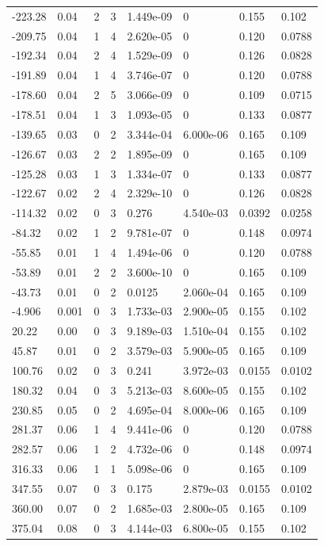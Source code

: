\documentclass[preview]{standalone}
\begin{document}
{{\begin{tabular}{L{1.2cm}C{1.2cm} C{0.3cm}C{0.5cm} C{1.4cm}C{1.4cm} C{1.4cm}C{1.4cm}}
  -223.28  &  0.04  & 2     &  3 &  1.449e-09  & 0  & 0.155 &  0.102   \\ 
  -209.75  &  0.04  & 1     &  4 &  2.620e-05  & 0  & 0.120 &  0.0788   \\ 
  -192.34  &  0.04  & 2     &  4 &  1.529e-09  & 0  & 0.126 &  0.0828   \\ 
  -191.89  &  0.04  & 1     &  4 &  3.746e-07  & 0  & 0.120 &  0.0788   \\ 
  -178.60  &  0.04  & 2     &  5 &  3.066e-09  & 0  & 0.109 &  0.0715   \\ 
  -178.51  &  0.04  & 1     &  3 &  1.093e-05  & 0  & 0.133 &  0.0877   \\ 
  -139.65  &  0.03  & 0     &  2 &  3.344e-04  & 6.000e-06  & 0.165 &  0.109   \\ 
  -126.67  &  0.03  & 2     &  2 &  1.895e-09  & 0  & 0.165 &  0.109   \\ 
  -125.28  &  0.03  & 1     &  3 &  1.334e-07  & 0  & 0.133 &  0.0877   \\ 
  -122.67  &  0.02  & 2     &  4 &  2.329e-10  & 0  & 0.126 &  0.0828   \\ 
  -114.32  &  0.02  & 0     &  3 &  0.276  & 4.540e-03  & 0.0392 &  0.0258   \\ 
  -84.32  &  0.02  & 1     &  2 &  9.781e-07  & 0  & 0.148 &  0.0974   \\ 
  -55.85  &  0.01  & 1     &  4 &  1.494e-06  & 0  & 0.120 &  0.0788   \\ 
  -53.89  &  0.01  & 2     &  2 &  3.600e-10  & 0  & 0.165 &  0.109   \\ 
  -43.73  &  0.01  & 0     &  2 &  0.0125  & 2.060e-04  & 0.165 &  0.109   \\ 
  -4.906  &  0.001  & 0     &  3 &  1.733e-03  & 2.900e-05  & 0.155 &  0.102   \\ 
  20.22  &  0.00  & 0     &  3 &  9.189e-03  & 1.510e-04  & 0.155 &  0.102   \\ 
  45.87  &  0.01  & 0     &  2 &  3.579e-03  & 5.900e-05  & 0.165 &  0.109   \\ 
  100.76  &  0.02  & 0     &  3 &  0.241  & 3.972e-03  & 0.0155 &  0.0102   \\ 
  180.32  &  0.04  & 0     &  3 &  5.213e-03  & 8.600e-05  & 0.155 &  0.102   \\ 
  230.85  &  0.05  & 0     &  2 &  4.695e-04  & 8.000e-06  & 0.165 &  0.109   \\ 
  281.37  &  0.06  & 1     &  4 &  9.441e-06  & 0  & 0.120 &  0.0788   \\ 
  282.57  &  0.06  & 1     &  2 &  4.732e-06  & 0  & 0.148 &  0.0974   \\ 
  316.33  &  0.06  & 1     &  1 &  5.098e-06  & 0  & 0.165 &  0.109   \\ 
  347.55  &  0.07  & 0     &  3 &  0.175  & 2.879e-03  & 0.0155 &  0.0102   \\ 
  360.00  &  0.07  & 0     &  2 &  1.685e-03  & 2.800e-05  & 0.165 &  0.109   \\ 
  375.04  &  0.08  & 0     &  3 &  4.144e-03  & 6.800e-05  & 0.155 &  0.102   \\ 
\hline 
\end{tabular} 

}}
\end{document}
